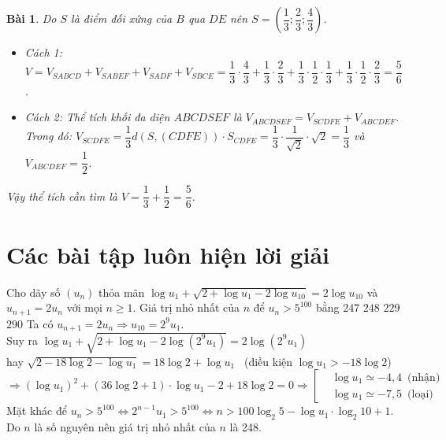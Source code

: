 \documentclass[12pt,a4paper,oneside]{article}
\newtheorem{bt}{Bài}
\newcommand{\hoac}[1]{ 
\left[\begin{aligned}#1\end{aligned}\right.}
\begin{document}
\begin{bt}
{		Do $ S $ là điểm đối xứng của $ B $ qua $ DE $ nên $ S =  \left(\dfrac{1}{3}; \dfrac{2}{3}; \dfrac{4}{3}\right) $.
		\begin{itemize}
			\item 		Cách 1: $ V = V_{SABCD} + V_{SABEF} + V_{SADF}+V_{SBCE}= \dfrac{1}{3} \cdot \dfrac{4}{3} + \dfrac{1}{3} \cdot \dfrac{2}{3} + \dfrac{1}{3} \cdot \dfrac{1}{2} \cdot \dfrac{1}{3} + \dfrac{1}{3} \cdot \dfrac{1}{2} \cdot \dfrac{2}{3} = \dfrac{5}{6} $.
			\item Cách 2: Thể tích khối đa diện $ ABCDSEF  $ là $ V_{ABCDSEF} = V_{SCDFE} + V_{ABCDEF}.$\\
			Trong đó: 
			$V_{SCDFE} = \dfrac{1}{3} d\left(S,(CDFE)\right) \cdot S_{CDFE} = \dfrac{1}{3} \cdot \dfrac{1}{\sqrt{2}} \cdot \sqrt{2} = \dfrac{1}{3} $ và $ V_{ABCDEF} = \dfrac{1}{2} $.
		\end{itemize}
		Vậy thể tích cần tìm là $ V = \dfrac{1}{3} + \dfrac{1}{2} = \dfrac{5}{6}.$ 
	}
\end{bt}		

\section{Các bài tập luôn hiện lời giải}
\begin{ex}	
	Cho dãy số $ (u_n) $	thỏa mãn $ \log u_1 +\sqrt{2 + \log u_1 - 2 \log u_{10} } = 2 \log u_{10}$ và $ u_{n+1} = 2u_n $ với mọi $ n \ge 1. $ Giá trị nhỏ nhất của $ n $ để $ u_n > 5^{100} $ bằng
	\choice
	{$247$}
	{\True $248$}
	{$229$}
	{$290$}
	\loigiai
	{
		Ta có $ u_{n+1} = 2u_n \Rightarrow u_{10} =2^9 u_1.   $ \\ Suy ra $ \log u_1 +\sqrt{2 + \log u_1 -2 \log (2^9 u_1)} = 2 \log (2^9 u_1) $ \\
		hay $ \sqrt{2 - 18 \log 2 - \log u_1} = 18 \log 2 + \log u_1 $ \, (điều kiện $ \log u_1 > -18 \log 2 $) \\
		$ \Rightarrow \left(\log u_1\right)^2 + \left(36 \log 2 + 1\right) \cdot \log u_1 -2 +18 \log 2 = 0 \Rightarrow \hoac{&\log u_1 \simeq -4,4 \, \text{ (nhận)} \\&\log u_1 \simeq -7,5 \, \text{ (loại)}  } $\\
		Mặt khác để $ u_n > 5^{100}  \Leftrightarrow 2^{n-1} u_1 >5^{100} \Leftrightarrow n > 100 \log_2 5 - \log u_1 \cdot \log_2 10 + 1 $.\\
		Do $ n  $  là số nguyên nên giá trị nhỏ nhất của $ n  $ là 248.
	}
\end{ex}
\end{document}
